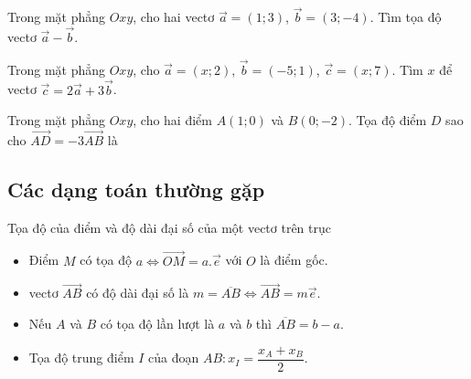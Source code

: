 \begin{vd}%
	Trong mặt phẳng $Oxy$, cho hai vectơ $\overrightarrow{a}=(1;3)$, $\overrightarrow{b}=(3;-4)$. Tìm tọa độ vectơ $\overrightarrow{a}-\overrightarrow{b}$.
\end{vd}
\begin{vd}%
	Trong mặt phẳng $Oxy$, cho $\overrightarrow{a}=(x;2)$, $\overrightarrow{b}=(-5;1)$, $\overrightarrow{c}=(x;7)$. Tìm $x$ để vectơ $\overrightarrow{c}=2\overrightarrow{a}+3\overrightarrow{b}$.
\end{vd}
\begin{vd}%
	Trong mặt phẳng $Oxy$, cho hai điểm $A(1;0)$ và $B(0;-2)$. Tọa độ điểm $D$ sao cho $\overrightarrow{AD}=-3\overrightarrow{AB}$ là
\end{vd}


\subsection{Các dạng toán thường gặp}

\begin{dang}{Tọa độ của điểm và độ dài đại số của một vectơ trên trục}
    \begin{itemize}
        \item Điểm $M$ có tọa độ $a \Leftrightarrow \vec{OM}=a.\vec{e}$ với $O$ là điểm gốc.
        \item vectơ $\vec{AB}$ có độ dài đại số là $m=\overline{AB}\Leftrightarrow \vec{AB}=m\vec{e}$.
        \item Nếu $A$ và $B$ có tọa độ lần lượt là $a$ và $b$ thì $\overline{AB}=b-a$.
        \item Tọa độ trung điểm $I$ của đoạn $AB: x_I=\dfrac{x_A + x_B}{2}$.
    \end{itemize}
\end{dang}

